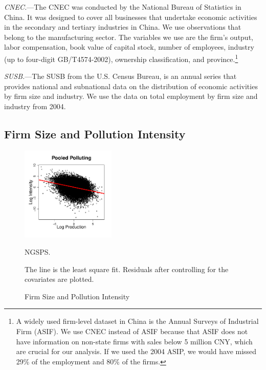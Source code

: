 \documentclass[AEJ]{AEA}
\begin{document}
\textit{CNEC.}---The CNEC was conducted by the National Bureau of Statistics in China. It was designed to cover {all} businesses that undertake economic activities in the secondary and tertiary industries in China. We use observations that belong to the manufacturing sector. The variables we use are the firm's output, labor compensation, book value of capital stock, number of employees, industry (up to four-digit GB/T4574-2002), ownership classification, and province.\footnote{A widely used firm-level dataset in China is the Annual Surveys of Industrial Firm (ASIF). We use CNEC instead of ASIF because that ASIF does not have information on non-state firms with sales below 5 million CNY, which are crucial for our analysis. If we used the 2004 ASIP, we would have missed 29\% of the employment and 80\% of the firms.}

\textit{SUSB.}---The SUSB from the U.S. Census Bureau, is an annual series that provides national and subnational data on the distribution of economic activities by firm size and industry. We use the data on total employment by firm size and industry from 2004.

\subsection{Firm Size and Pollution Intensity}

\begin{figure}[t]
\caption{Firm Size and Pollution Intensity}
\label{fig:codscatter}
    \begin{center}
    \includegraphics[width=0.40\textwidth]{./Figures/pooled_intensity_size.pdf}
    \end{center}
    \begin{figurenotes}[Source]
        NGSPS.
    \end{figurenotes}
    \begin{figurenotes}
        The line is the least square fit. Residuals after controlling for the covariates are plotted.
    \end{figurenotes}
\end{figure}
\end{document}
